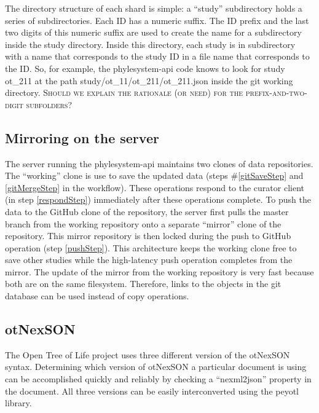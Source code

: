 \documentclass{bioinfo}
\newcommand{\ps}{phylesystem\xspace}
\newcommand{\otol}{Open Tree of Life\xspace}
\newcommand{\nexson}{otNexSON\xspace}
\newcommand{\jfacomment}[1]{{\color{orange} \textsc{#1}}\xspace}
\begin{document}
\begin{methods}
The directory structure of each shard is simple: a ``study'' subdirectory holds 
a series of subdirectories.
Each ID has a numeric suffix.
The ID prefix and the last two digits of this numeric suffix are used to create the name
    for a subdirectory inside the study directory.
Inside this directory, each study is in subdirectory with a name that corresponds to the study ID
    in a file name that corresponds to the ID.
So, for example, the \ps-api code knows to look for study ot\_211 at the path
    study/ot\_11/ot\_211/ot\_211.json inside the git working directory.
    \jfacomment{Should we explain the rationale (or need) for the prefix-and-two-digit subfolders?}
\subsection*{Mirroring on the server}
The server running the \ps-api maintains two clones of data repositories.
The ``working'' clone is use to save the updated data (steps \#\ref{gitSaveStep} and \ref{gitMergeStep}  in the workflow).
These operations respond to the curator client (in step \ref{respondStep}) immediately
    after these operations complete.
To push the data to the GitHub clone of the repository, the server first pulls the master branch from the working repository onto a separate
    ``mirror'' clone of the repository.
This mirror repository is then locked during the push to GitHub operation (step \ref{pushStep}).
This architecture keeps the working clone free to save other studies while the high-latency push operation completes from the mirror.
The update of the mirror from the working repository is very fast because both are on the same filesystem.
Therefore, links to the objects in the git database can be used instead of copy operations.

\subsection*{\nexson}
The \otol project uses three different version of the \nexson syntax.
Determining which version of \nexson a particular document is using
    can be accomplished quickly and reliably by checking a  ``nexml2json'' property in the document.
All three versions can be easily interconverted using the peyotl library.


\end{methods}
\end{document}
